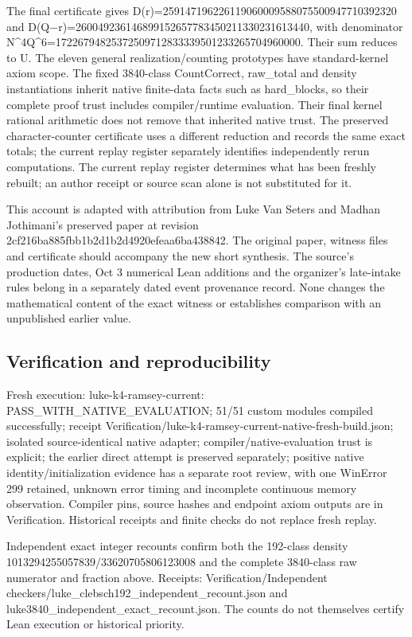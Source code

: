 \documentclass[11pt,a4paper]{article}
\begin{document}
The final certificate gives D(r)=259147196226119060009588075500947710392320 and D(Q\ensuremath{-}r)=260049236146899152657783450211330231613440, with denominator N\textasciicircum{}4Q\textasciicircum{}6=17226794825372509712833339501233265704960000. Their sum reduces to U. The eleven general realization/counting prototypes have standard-kernel axiom scope. The fixed 3840-class CountCorrect, raw\_total and density instantiations inherit native finite-data facts such as hard\_blocks, so their complete proof trust includes compiler/runtime evaluation. Their final kernel rational arithmetic does not remove that inherited native trust. The preserved character-counter certificate uses a different reduction and records the same exact totals; the current replay register separately identifies independently rerun computations. The current replay register determines what has been freshly rebuilt; an author receipt or source scan alone is not substituted for it.

This account is adapted with attribution from Luke Van Seters and Madhan Jothimani's preserved paper at revision 2cf216ba885fbb1b2d1b2d4920efeaa6ba438842. The original paper, witness files and certificate should accompany the new short synthesis. The source's production dates, Oct 3 numerical Lean additions and the organizer's late-intake rules belong in a separately dated event provenance record. None changes the mathematical content of the exact witness or establishes comparison with an unpublished earlier value.

\subsection{Verification and reproducibility}
Fresh execution: luke-k4-ramsey-current: PASS\_WITH\_NATIVE\_EVALUATION; 51/51 custom modules compiled successfully; receipt Verification/luke-k4-ramsey-current-native-fresh-build.json; isolated source-identical native adapter; compiler/native-evaluation trust is explicit; the earlier direct attempt is preserved separately; positive native identity/initialization evidence has a separate root review, with one WinError 299 retained, unknown error timing and incomplete continuous memory observation. Compiler pins, source hashes and endpoint axiom outputs are in Verification. Historical receipts and finite checks do not replace fresh replay.

{\small Independent exact integer recounts confirm both the 192-class density 1013294255057839/33620705806123008 and the complete 3840-class raw numerator and fraction above. Receipts: Verification/Independent checkers/luke\_clebsch192\_independent\_recount.json and luke3840\_independent\_exact\_recount.json. The counts do not themselves certify Lean execution or historical priority.\par}
\end{document}
